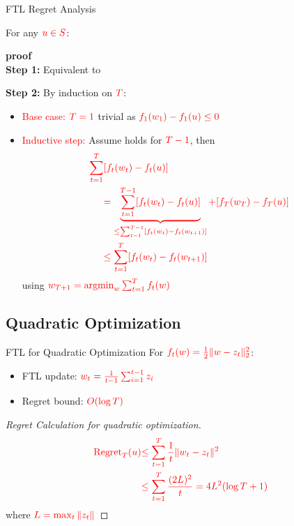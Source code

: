 \documentclass[handout]{beamer}
\begin{document}
\begin{frame}{FTL Regret Analysis}
\begin{theorem}[Lemma 2.1]
  For any $\textcolor{red}{u \in S}$:
  \R{\[
    \text{Regret}_T(\mathbf{u}) = \sum_{t=1}^{T} \left(f_t(\mathbf{w}_t) - f_t(\mathbf{u})\right) \leq \sum_{t=1}^{T} \left(f_t(\mathbf{w}_t) - f_t(\mathbf{w}_{t+1})\right).
  \]}
\end{theorem}
{\bf proof} \\
{\bf Step 1:} Equivalent to
\end{frame}

\begin{frame}

{\bf Step 2:} By induction on $\textcolor{red}{T}$:
\begin{itemize}
\item \textcolor{red}{Base case:} $\textcolor{red}{T=1}$ trivial as $\textcolor{red}{f_1(w_1) - f_1(u) \leq 0}$

\item \textcolor{red}{Inductive step:} Assume holds for $\textcolor{red}{T-1}$, then
\begin{align*}
\textcolor{red}{\sum_{t=1}^T} &\textcolor{red}{[f_t(w_t) - f_t(u)]} \\
&\textcolor{red}{= \underbrace{\sum_{t=1}^{T-1} [f_t(w_t) - f_t(u)]}_{\leq \sum_{t=1}^{T-1} [f_t(w_t) - f_t(w_{t+1})]} + [f_T(w_T) - f_T(u)]} \\
&\textcolor{red}{\leq \sum_{t=1}^T [f_t(w_t) - f_t(w_{t+1})]}
\end{align*}
using $\textcolor{red}{w_{T+1} = \operatorname{argmin}_w \sum_{t=1}^T f_t(w)}$
\end{itemize}
\end{frame}

\subsection{Quadratic Optimization}
\begin{frame}{FTL for Quadratic Optimization}
For $\textcolor{red}{f_t(w) = \frac{1}{2}\|w - z_t\|_2^2}$:
\begin{itemize}
\item FTL update: $\textcolor{red}{w_t = \frac{1}{t-1}\sum_{i=1}^{t-1} z_i}$
\item Regret bound: $\textcolor{red}{O(\log T)}$
\end{itemize}
\begin{proof}[Regret Calculation for quadratic optimization]
\begin{align*}
\textcolor{red}{\text{Regret}_T(u)} &\textcolor{red}{\leq \sum_{t=1}^T \frac{1}{t} \|w_t - z_t\|^2} \\
&\textcolor{red}{\leq \sum_{t=1}^T \frac{(2L)^2}{t} = 4L^2(\log T + 1)}
\end{align*}
where $\textcolor{red}{L = \max_t \|z_t\|}$
\end{proof}
\end{frame}
\end{document}
